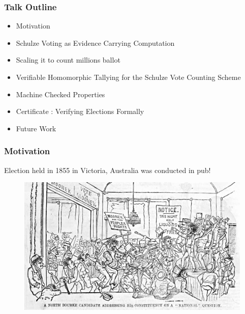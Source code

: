\documentclass{beamer}
\begin{document}

%

\begin{frame}
\frametitle{Talk Outline}
\begin{itemize}
\item Motivation
\item Schulze Voting as Evidence Carrying Computation
\item Scaling it to count millions ballot
\item Verifiable Homomorphic Tallying for the Schulze Vote Counting Scheme
\item Machine Checked Properties 
\item Certificate : Verifying Elections Formally
\item Future Work
\end{itemize}
\end{frame}



\begin{frame}
\frametitle{Motivation}
{Election held in 1855 in Victoria, Australia 
	  was conducted in pub!}
\begin{figure}
	\begin{center}
	\includegraphics[scale=0.20]{NorthBourke.jpg}
	\end{center}
  \end{figure}   
\end{frame}
\end{document}
